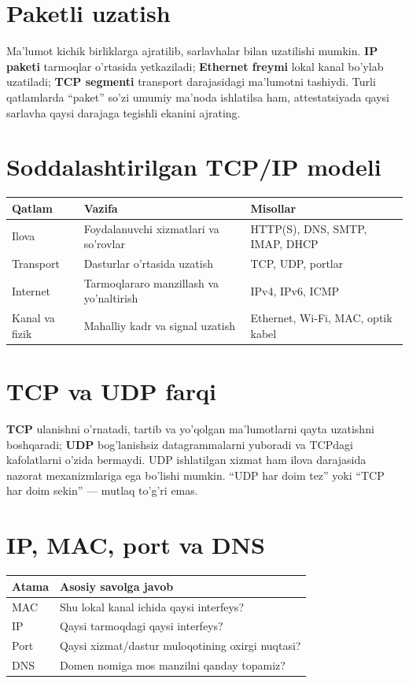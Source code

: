 \documentclass[11pt,a4paper,oneside]{book}
\newcommand{\kw}[1]{\textbf{\color{Deep}#1}}
\begin{document}
\section{Paketli uzatish}
Ma'lumot kichik birliklarga ajratilib, sarlavhalar bilan uzatilishi mumkin. \kw{IP paketi} tarmoqlar o'rtasida yetkaziladi; \kw{Ethernet freymi} lokal kanal bo'ylab uzatiladi; \kw{TCP segmenti} transport darajasidagi ma'lumotni tashiydi. Turli qatlamlarda ``paket'' so'zi umumiy ma'noda ishlatilsa ham, attestatsiyada qaysi sarlavha qaysi darajaga tegishli ekanini ajrating.
\section{Soddalashtirilgan TCP/IP modeli}
\par\medskip
\par\medskip
\begin{tabularx}{\textwidth}{p{}p{}Y}\toprule
Qatlam & Vazifa & Misollar\\\midrule
Ilova & Foydalanuvchi xizmatlari va so'rovlar & HTTP(S), DNS, SMTP, IMAP, DHCP\\
Transport & Dasturlar o'rtasida uzatish & TCP, UDP, portlar\\
Internet & Tarmoqlararo manzillash va yo'naltirish & IPv4, IPv6, ICMP\\
Kanal va fizik & Mahalliy kadr va signal uzatish & Ethernet, Wi-Fi, MAC, optik kabel\\\bottomrule\end{tabularx}
\section{TCP va UDP farqi}
\kw{TCP} ulanishni o'rnatadi, tartib va yo'qolgan ma'lumotlarni qayta uzatishni boshqaradi; \kw{UDP} bog'lanishsiz datagrammalarni yuboradi va TCPdagi kafolatlarni o'zida bermaydi. UDP ishlatilgan xizmat ham ilova darajasida nazorat mexanizmlariga ega bo'lishi mumkin. ``UDP har doim tez'' yoki ``TCP har doim sekin'' — mutlaq to'g'ri emas.
\section{IP, MAC, port va DNS}
\par\medskip
\par\medskip
\begin{tabularx}{\textwidth}{p{}Y}\toprule
Atama & Asosiy savolga javob\\\midrule
MAC & Shu lokal kanal ichida qaysi interfeys?\\
IP & Qaysi tarmoqdagi qaysi interfeys?\\
Port & Qaysi xizmat/dastur muloqotining oxirgi nuqtasi?\\
DNS & Domen nomiga mos manzilni qanday topamiz?\\\bottomrule\end{tabularx}
\end{document}
